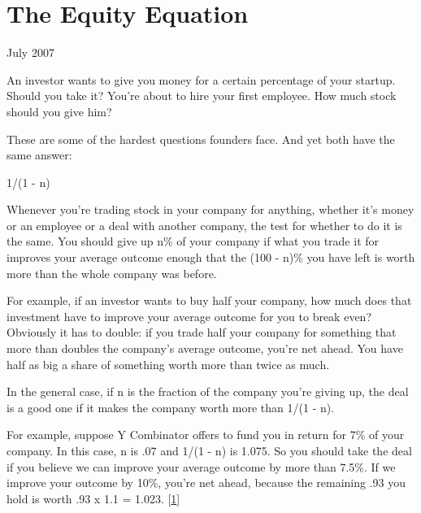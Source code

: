 \chapter{The Equity Equation}


            
              
                

July 2007

An investor wants to give you money for
                  a certain percentage of your startup. Should you take it?
                  You're about to hire your first employee. How much stock
                  should you give him?

These are some of the hardest
                  questions founders face. And yet both have the same answer:

1/(1
                  - n)

Whenever you're trading stock in your company
                  for anything, whether it's money or an employee or a deal with
                  another company, the test for whether to do it is the same.
                  You should give up n\% of your company if what you trade it for
                  improves your average outcome enough that the (100 - n)\% you
                  have left is worth more than the whole company was before.

For
                  example, if an investor wants to buy half your company, how
                  much does that investment have to improve your average outcome
                  for you to break even? Obviously it has to double: if you
                  trade half your company for something that more than doubles
                  the company's average outcome, you're net ahead. You have half
                  as big a share of something worth more than twice as much.

In
                  the general case, if n is the fraction of the company you're
                  giving up, the deal is a good one if it makes the company
                  worth more than 1/(1 - n).

For example, suppose Y
                  Combinator offers to fund you in return for 7\% of your
                  company. In this case, n is .07 and 1/(1 - n) is 1.075. So you
                  should take the deal if you believe we can improve your
                  average outcome by more than 7.5\%. If we improve your outcome
                  by 10\%, you're net ahead, because the remaining .93 you hold
                  is worth .93 x 1.1 = 1.023.
                  [\href{\#f1n}{1}]

